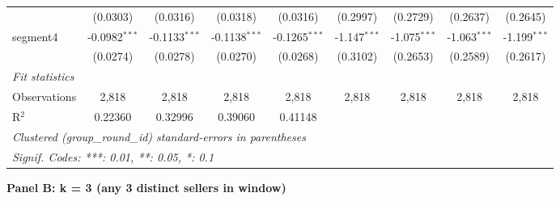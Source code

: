 \begin{tabular}{lcccccccc}
                                    & (0.0303)        & (0.0316)        & (0.0318)        & (0.0316)        & (0.2997)       & (0.2729)       & (0.2637)       & (0.2645)\\   
   segment4                         & -0.0982$^{***}$ & -0.1133$^{***}$ & -0.1138$^{***}$ & -0.1265$^{***}$ & -1.147$^{***}$ & -1.075$^{***}$ & -1.063$^{***}$ & -1.199$^{***}$\\   
                                    & (0.0274)        & (0.0278)        & (0.0270)        & (0.0268)        & (0.3102)       & (0.2653)       & (0.2589)       & (0.2617)\\   
   \midrule
   \emph{Fit statistics}\\
   Observations                     & 2,818           & 2,818           & 2,818           & 2,818           & 2,818          & 2,818          & 2,818          & 2,818\\  
   R$^2$                            & 0.22360         & 0.32996         & 0.39060         & 0.41148         &                &                &                & \\  
   \midrule \midrule
   \multicolumn{9}{l}{\emph{Clustered (group\_round\_id) standard-errors in parentheses}}\\
   \multicolumn{9}{l}{\emph{Signif. Codes: ***: 0.01, **: 0.05, *: 0.1}}\\
\end{tabular}
\par\endgroup
\medskip
\textbf{Panel B: k = 3 (any 3 distinct sellers in window)}\\
\begingroup
\centering
\scriptsize

